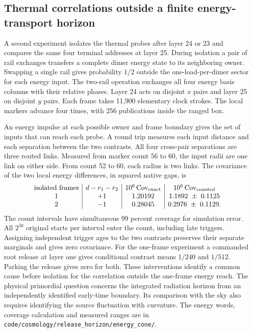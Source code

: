 \documentclass[11pt]{article}
\newcommand{\pathref}[1]{\nolinkurl{#1}}
\theoremstyle{remark}
\begin{document}
\subsection{Thermal correlations outside a finite energy-transport horizon}
A second experiment isolates the thermal probes after layer 24 or 23
and compares the same four terminal addresses at layer 25. During
isolation a pair of rail exchanges transfers a complete dimer energy
state to its neighboring owner. Swapping a single rail gives probability
\(1/2\) outside the one-load-per-dimer sector for each energy input.
The two-rail operation exchanges all four energy basis columns with
their relative phases. Layer 24 acts on disjoint \(x\) pairs and layer
25 on disjoint \(y\) pairs. Each frame takes 11,900 elementary clock
strokes. The local markers advance four times, with 256 publications
inside the ranged box.

An energy impulse at each possible owner and frame boundary gives the
set of inputs that can reach each probe. A round trip measures each
input distance and each separation between the two contrasts. All four
cross-pair separations are three routed links. Measured from marker
count 56 to 60, the input radii are one link on either side. From count
52 to 60, each radius is two links. The covariance of the two local
energy differences, in squared native gaps, is
\[
\begin{array}{c|c|c|c}
 \text{isolated frames} & d-r_1-r_2 & 10^6\,\mathrm{Cov}_{\rm exact}
                                     & 10^6\,\mathrm{Cov}_{\rm counted} \\
 1 & +1 & 1.20192 & 1.1892\ \pm\ 0.1125\\
 2 & -1 & 0.28045 & 0.2976\ \pm\ 0.1129 .
\end{array}
\]
The count intervals have simultaneous 99 percent coverage for simulation
error. All \(2^{50}\) original starts per interval enter the count,
including late triggers. Assigning independent trigger ages to the two
contrasts preserves their separate marginals and gives zero covariance.
For the one-frame experiment a commanded root release at layer one gives
conditional contrast means \(1/240\) and \(1/512\). Parking the release
gives zero for both. These interventions identify a common cause before
isolation for the correlation outside the one-frame energy reach. The physical
primordial question concerns the integrated radiation horizon from an
independently identified early-time boundary. Its comparison with the
sky also requires identifying the source fluctuation with curvature.
The energy words, coverage calculation and measured ranges are in
\mbox{\pathref{code/cosmology/release_horizon/energy_cone/}}.
\end{document}
